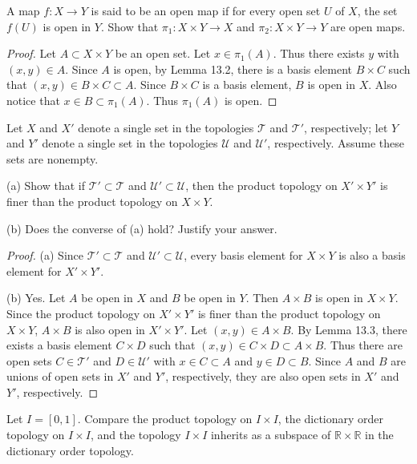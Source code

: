 \documentclass[12pt]{article}
\newenvironment{problem}[2][Problem]
{
	\begin{trivlist} 
		\item[\hskip \labelsep {\bfseries #1 #2:}]
	}
{
	\end{trivlist}
	}
\begin{document}
\begin{problem}{16.4}
A map $f: X \rightarrow Y$ is said to be an open map if for every open set $U$ of $X$, the set $f(U)$ is open in $Y$. Show that $\pi_1: X \times Y \rightarrow X$ and $\pi_2: X \times Y \rightarrow Y$ are open maps.
\end{problem}
\begin{proof}
Let $A \subset X \times Y$ be an open set. Let $x \in \pi_1(A)$. Thus there exists $y$ with $(x, y) \in A$. Since $A$ is open, by Lemma 13.2, there is a basis element $B \times C$ such that $(x, y) \in B \times C \subset A$. Since $B \times C$ is a basis element, $B$ is open in $X$. Also notice that $x \in B \subset \pi_1(A)$. Thus $\pi_1(A)$ is open.
\end{proof}

\begin{problem}{16.5}
Let $X$ and $X'$ denote a single set in the topologies $\mathcal{T}$ and $\mathcal{T'}$, respectively; let $Y$ and $Y'$ denote a single set in the topologies $\mathcal{U}$ and $\mathcal{U'}$, respectively. Assume these sets are nonempty.

(a) Show that if $\mathcal{T'} \subset \mathcal{T}$ and $\mathcal{U'} \subset \mathcal{U}$, then the product topology on $X' \times Y'$ is finer than the product topology on $X \times Y$.

(b) Does the converse of (a) hold? Justify your answer.
\end{problem}
\begin{proof}
(a) Since $\mathcal{T'} \subset \mathcal{T}$ and $\mathcal{U'} \subset \mathcal{U}$, every basis element for $X \times Y$ is also a basis element for $X' \times Y'$.

(b) Yes. Let $A$ be open in $X$ and $B$ be open in $Y$. Then $A \times B$ is open in $X \times Y$. Since the product topology on $X' \times Y'$ is finer than the product topology on $X \times Y$, $A \times B$ is also open in $X' \times Y'$. Let $(x, y) \in A \times B$. By Lemma 13.3, there exists a basis element $C \times D$ such that $(x, y) \in C \times D \subset A \times B$. Thus there are open sets $C \in \mathcal{T'}$ and $D \in \mathcal{U'}$ with $x \in C \subset A$ and $y \in D \subset B$. Since $A$ and $B$ are unions of open sets in $X'$ and $Y'$, respectively, they are also open sets in $X'$ and $Y'$, respectively.
\end{proof}

\begin{problem}{16.10}
Let $I = [0, 1]$. Compare the product topology on $I \times I$, the dictionary order topology on $I \times I$, and the topology $I \times I$ inherits as a subspace of $\mathbb{R} \times \mathbb{R}$ in the dictionary order topology.
\end{problem}
\end{document}
